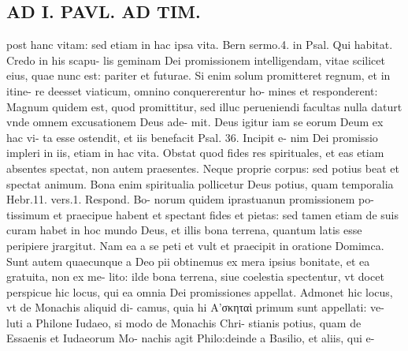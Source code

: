\documentclass{article}
\begin{document}
\begin{pages}
\section*{AD I. PAVL. AD TIM. }
\marginpar{[ p.212 ]}\pstart post hanc vitam: sed etiam in hac ipsa vita. Bern sermo.4. in Psal. Qui habitat. Credo in his scapu- lis geminam Dei promissionem intelligendam, vitae scilicet eius, quae nunc est: pariter et futurae. Si enim solum promitteret regnum, et in itine- re deesset viaticum, omnino conquererentur ho- mines et responderent: Magnum quidem est, quod promittitur, sed illuc perueniendi facultas nulla daturt vnde omnem excusationem Deus ade- mit. Deus igitur iam se eorum Deum ex hac vi- ta esse ostendit, et iis benefacit Psal. 36. Incipit e- nim Dei promissio impleri in iis, etiam in hac vita.  \pend\pstart Obstat quod fides res spirituales, et eas etiam absentes spectat, non autem praesentes. Neque proprie corpus: sed potius beat et spectat animum. Bona enim spiritualia pollicetur Deus potius, quam temporalia Hebr.11. vers.1. Respond. Bo- norum quidem iprastuanun promissionem po- tissimum et praecipue habent et spectant fides et pietas: sed tamen etiam de suis curam habet in hoc mundo Deus, et illis bona terrena, quantum latis esse peripiere jrargitut. Nam ea a se peti et vult et praecipit in oratione Domimca.  \pend\pstart Sunt autem quaecunque a Deo pii obtinemus ex mera ipsius bonitate, et ea gratuita, non ex me- lito: ilde bona terrena, siue coelestia spectentur, vt docet perspicue hic locus, qui ea omnia Dei promissiones appellat.  \pend\pstart Admonet hic locus, vt de Monachis aliquid di- camus, quia hi Α’σκηταὶ primum sunt appellati: ve- luti a Philone Iudaeo, si modo de Monachis Chri- stianis potius, quam de Essaenis et Iudaeorum Mo- nachis agit Philo:deinde a Basilio, et aliis, qui e-  \pend

\end{pages}
\end{document}
